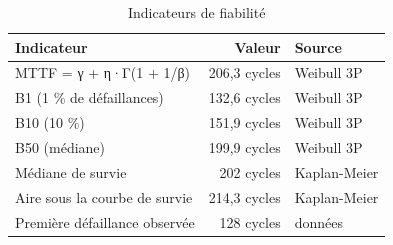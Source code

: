 \begin{table}[htbp]
\centering
\caption{Indicateurs de fiabilité}
\label{tab:fiabilite_indicateurs}
\begin{tabular}{lrl}
\toprule
Indicateur & Valeur & Source \\
\midrule
MTTF = γ + η·Γ(1 + 1/β) & 206,3 cycles & Weibull 3P \\
B1 (1 \% de défaillances) & 132,6 cycles & Weibull 3P \\
B10 (10 \%) & 151,9 cycles & Weibull 3P \\
B50 (médiane) & 199,9 cycles & Weibull 3P \\
Médiane de survie & 202 cycles & Kaplan-Meier \\
Aire sous la courbe de survie & 214,3 cycles & Kaplan-Meier \\
Première défaillance observée & 128 cycles & données \\
\bottomrule
\end{tabular}
\end{table}

